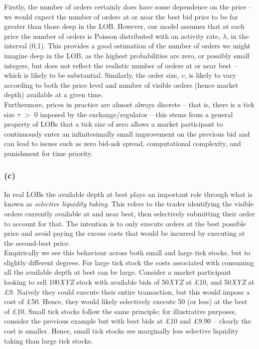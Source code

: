 \documentclass{article}
\begin{document}
Firstly, the number of orders certainly does have some dependence on the price – we would expect the number of orders at or near the best bid price to be far greater than those deep in the LOB. However, our model assumes that at each price the number of orders is Poisson distributed with an activity rate, $\lambda$, in the interval (0,1). This provides a good estimation of the number of orders we might imagine deep in the LOB, as the highest probabilities are zero, or possibly small integers, but does not reflect the realistic number of orders at or near best – which is likely to be substantial. Similarly, the order size, $v$, is likely to vary according to both the price level and number of visible orders (hence market depth) available at a given time. \\
\newpage
Furthermore, prices in practice are almost always discrete – that is, there is a tick size $\tau$ $>$ 0 imposed by the exchange/regulator – this stems from a general property of LOBs that a tick size of zero allows a market participant to continuously enter an infinitesimally small improvement on the previous bid and can lead to issues such as zero bid-ask spread, computational complexity, and punishment for time priority. \\

\subsubsection*{(c)}
In real LOBs the available depth at best plays an important role through what is known as \textit{selective liquidity taking}. This refers to the trader identifying the visible orders currently available at and near best, then selectively submitting their order to account for that. The intention is to only execute orders at the best possible price and avoid paying the excess costs that would be incurred by executing at the second-best price. \\

Empirically we see this behaviour across both small and large tick stocks, but to slightly different degrees. For large tick stock the costs associated with consuming all the available depth at best can be large. Consider a market participant looking to sell 100\textit{XYZ} stock with available bids of 50\textit{XYZ} at £10, and 50\textit{XYZ} at £9. Naively they could execute their entire transaction, but this would impose a cost of £50. Hence, they would likely selectively execute 50 (or less) at the best of £10. Small tick stocks follow the same principle; for illustrative purposes, consider the previous example but with best bids at £10 and £9.90 – clearly the cost is smaller. Hence, small tick stocks see marginally less selective liquidity taking than large tick stocks. \\
\end{document}
